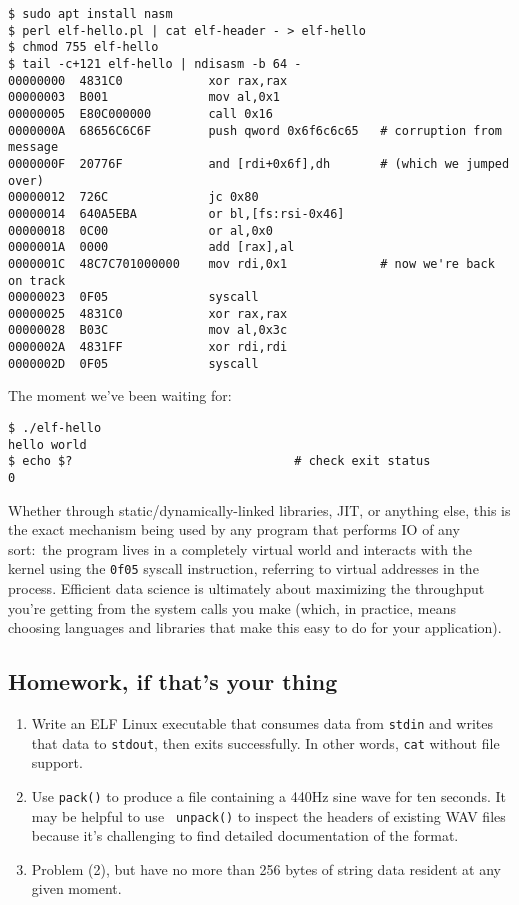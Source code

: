 \begin{verbatim}
$ sudo apt install nasm
$ perl elf-hello.pl | cat elf-header - > elf-hello
$ chmod 755 elf-hello
$ tail -c+121 elf-hello | ndisasm -b 64 -
00000000  4831C0            xor rax,rax
00000003  B001              mov al,0x1
00000005  E80C000000        call 0x16
0000000A  68656C6C6F        push qword 0x6f6c6c65   # corruption from message
0000000F  20776F            and [rdi+0x6f],dh       # (which we jumped over)
00000012  726C              jc 0x80
00000014  640A5EBA          or bl,[fs:rsi-0x46]
00000018  0C00              or al,0x0
0000001A  0000              add [rax],al
0000001C  48C7C701000000    mov rdi,0x1             # now we're back on track
00000023  0F05              syscall
00000025  4831C0            xor rax,rax
00000028  B03C              mov al,0x3c
0000002A  4831FF            xor rdi,rdi
0000002D  0F05              syscall\end{verbatim}

The moment we've been waiting for:

\begin{verbatim}
$ ./elf-hello
hello world
$ echo $?                               # check exit status
0\end{verbatim}

Whether through static/dynamically-linked libraries, JIT, or anything else, this
is the exact mechanism being used by any program that performs IO of any
sort:~the program lives in a completely virtual world and interacts with the
kernel using the {\tt 0f05} syscall instruction, referring to virtual addresses
in the process. Efficient data science is ultimately about maximizing the
throughput you're getting from the system calls you make (which, in practice,
means choosing languages and libraries that make this easy to do for your
application).

\subsection{Homework, if that's your thing}
\begin{enumerate}
  \item Write an ELF Linux executable that consumes data from {\tt stdin} and
        writes that data to {\tt stdout}, then exits successfully. In other
        words, {\tt cat} without file support.
  \item Use {\tt pack()} to produce a
         file containing a
        440Hz sine wave for ten seconds. It may be helpful to use {\tt
        unpack()} to inspect the headers of existing WAV files because it's
        challenging to find detailed documentation of the format.
  \item Problem (2), but have no more than 256 bytes of string data resident
        at any given moment.
\end{enumerate}
